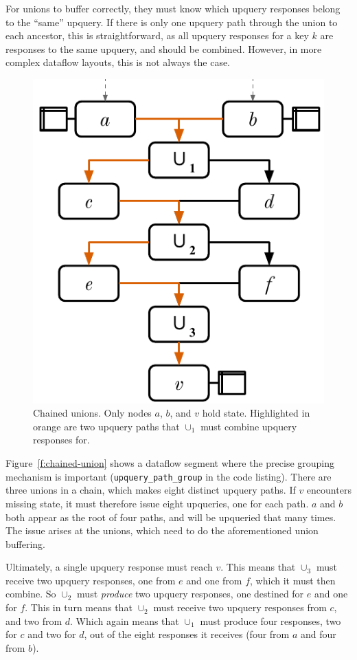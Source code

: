 For unions to buffer correctly, they must know which upquery responses belong to
the ``same'' upquery. If there is only one upquery path through the union to
each ancestor, this is straightforward, as all upquery responses for a key $k$
are responses to the same upquery, and should be combined. However, in more
complex dataflow layouts, this is not always the case.

\begin{figure}[t]
  \centering
  \includegraphics{diagrams/Chained Unions.pdf}
  \caption{Chained unions. Only nodes $a$, $b$, and $v$ hold state. Highlighted
  in orange are two upquery paths that $\cup_1$ must combine upquery responses
  for.}
  \label{f:chained-union}
\end{figure}

Figure~\vref{f:chained-union} shows a dataflow segment where the precise grouping
mechanism is important (\texttt{upquery\_path\_group} in the code listing).
There are three unions in a chain, which makes eight distinct upquery paths. If
$v$ encounters missing state, it must therefore issue eight upqueries, one for
each path. $a$ and $b$ both appear as the root of four paths, and will be
upqueried that many times. The issue arises at the unions, which need to do
the aforementioned union buffering.

Ultimately, a single upquery response must reach $v$. This means that $\cup_3$
must receive two upquery responses, one from $e$ and one from $f$, which it must
then combine. So $\cup_2$ must \emph{produce} two upquery responses, one
destined for $e$ and one for $f$. This in turn means that $\cup_2$ must receive
two upquery responses from $c$, and two from $d$. Which again means that
$\cup_1$ must produce four responses, two for $c$ and two for $d$, out of the
eight responses it receives (four from $a$ and four from $b$).

